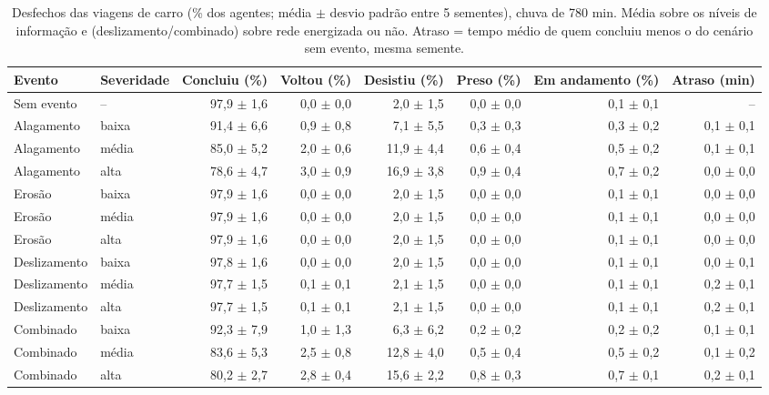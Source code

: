 \begin{table}[htbp]
\centering
\scriptsize
\caption{Desfechos das viagens de carro (\% dos agentes; média $\pm$ desvio padrão entre 5 sementes), chuva de 780 min. Média sobre os níveis de informação e (deslizamento/combinado) sobre rede energizada ou não. Atraso = tempo médio de quem concluiu menos o do cenário sem evento, mesma semente.}
\label{tab:t1_780_carro}
\begin{tabular}{llrrrrrr}
\toprule
Evento & Severidade & Concluiu (\%) & Voltou (\%) & Desistiu (\%) & Preso (\%) & Em andamento (\%) & Atraso (min) \\
\midrule
Sem evento & -- & 97,9 $\pm$ 1,6 & 0,0 $\pm$ 0,0 & 2,0 $\pm$ 1,5 & 0,0 $\pm$ 0,0 & 0,1 $\pm$ 0,1 & -- \\
Alagamento & baixa & 91,4 $\pm$ 6,6 & 0,9 $\pm$ 0,8 & 7,1 $\pm$ 5,5 & 0,3 $\pm$ 0,3 & 0,3 $\pm$ 0,2 & 0,1 $\pm$ 0,1 \\
Alagamento & média & 85,0 $\pm$ 5,2 & 2,0 $\pm$ 0,6 & 11,9 $\pm$ 4,4 & 0,6 $\pm$ 0,4 & 0,5 $\pm$ 0,2 & 0,1 $\pm$ 0,1 \\
Alagamento & alta & 78,6 $\pm$ 4,7 & 3,0 $\pm$ 0,9 & 16,9 $\pm$ 3,8 & 0,9 $\pm$ 0,4 & 0,7 $\pm$ 0,2 & 0,0 $\pm$ 0,0 \\
Erosão & baixa & 97,9 $\pm$ 1,6 & 0,0 $\pm$ 0,0 & 2,0 $\pm$ 1,5 & 0,0 $\pm$ 0,0 & 0,1 $\pm$ 0,1 & 0,0 $\pm$ 0,0 \\
Erosão & média & 97,9 $\pm$ 1,6 & 0,0 $\pm$ 0,0 & 2,0 $\pm$ 1,5 & 0,0 $\pm$ 0,0 & 0,1 $\pm$ 0,1 & 0,0 $\pm$ 0,0 \\
Erosão & alta & 97,9 $\pm$ 1,6 & 0,0 $\pm$ 0,0 & 2,0 $\pm$ 1,5 & 0,0 $\pm$ 0,0 & 0,1 $\pm$ 0,1 & 0,0 $\pm$ 0,0 \\
Deslizamento & baixa & 97,8 $\pm$ 1,6 & 0,0 $\pm$ 0,0 & 2,0 $\pm$ 1,5 & 0,0 $\pm$ 0,0 & 0,1 $\pm$ 0,1 & 0,0 $\pm$ 0,1 \\
Deslizamento & média & 97,7 $\pm$ 1,5 & 0,1 $\pm$ 0,1 & 2,1 $\pm$ 1,5 & 0,0 $\pm$ 0,0 & 0,1 $\pm$ 0,1 & 0,2 $\pm$ 0,1 \\
Deslizamento & alta & 97,7 $\pm$ 1,5 & 0,1 $\pm$ 0,1 & 2,1 $\pm$ 1,5 & 0,0 $\pm$ 0,0 & 0,1 $\pm$ 0,1 & 0,2 $\pm$ 0,1 \\
Combinado & baixa & 92,3 $\pm$ 7,9 & 1,0 $\pm$ 1,3 & 6,3 $\pm$ 6,2 & 0,2 $\pm$ 0,2 & 0,2 $\pm$ 0,2 & 0,1 $\pm$ 0,1 \\
Combinado & média & 83,6 $\pm$ 5,3 & 2,5 $\pm$ 0,8 & 12,8 $\pm$ 4,0 & 0,5 $\pm$ 0,4 & 0,5 $\pm$ 0,2 & 0,1 $\pm$ 0,2 \\
Combinado & alta & 80,2 $\pm$ 2,7 & 2,8 $\pm$ 0,4 & 15,6 $\pm$ 2,2 & 0,8 $\pm$ 0,3 & 0,7 $\pm$ 0,1 & 0,2 $\pm$ 0,1 \\
\bottomrule
\end{tabular}
\end{table}
